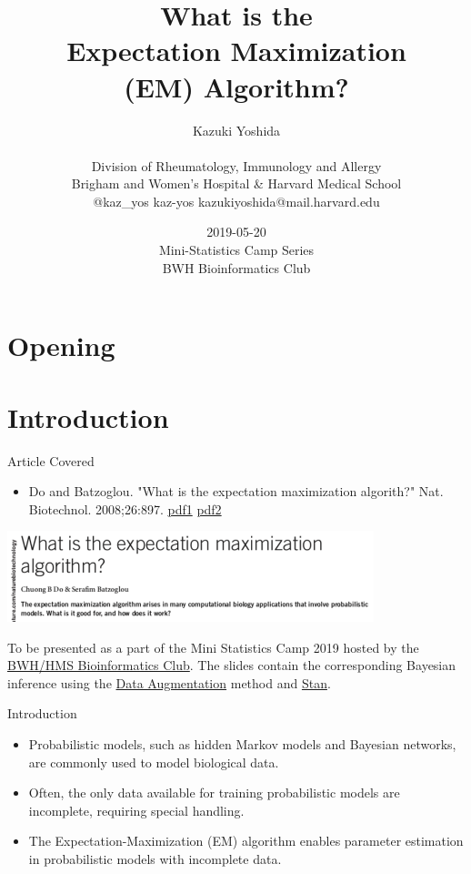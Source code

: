\documentclass[dvipdfmx,bigger,aspectratio=169]{beamer}
\author{Kazuki Yoshida \\ \\ Division of Rheumatology, Immunology and Allergy \\ Brigham and Women's Hospital \& Harvard Medical School \\ \faTwitter @kaz\_yos \faGithub kaz-yos \faEnvelope kazukiyoshida@mail.harvard.edu}
\date{2019-05-20\\ Mini-Statistics Camp Series \\ BWH Bioinformatics Club \\}
\title{What is the \\ Expectation Maximization \\ (EM) Algorithm? \\}
\begin{document}
\maketitle
\section{Opening}
\label{sec:orgb609150}


\section{Introduction}
\label{sec:org0b512a1}
\begin{frame}[label={sec:orgff30f97}]{Article Covered}
\begin{itemize}
\item Do and Batzoglou. "What is the expectation maximization algorith?" Nat. Biotechnol. 2008;26:897. \cite{doWhatExpectationMaximization2008} \href{https://www.cmi.ac.in/\~madhavan/courses/dmml2019jan/literature/EM\_algorithm\_2coin\_example.pdf}{pdf1} \href{http://www.utdallas.edu/\~prr105020/biol6385/2019/lecture/lecture\_4\_em\_paper.pdf}{pdf2}
\end{itemize}
\begin{center}
\includegraphics[page=1,keepaspectratio,width=0.8\textwidth]{./source/em_algo.png}
\end{center}
\footnotesize
To be presented as a part of the Mini Statistics Camp 2019 hosted by the \href{http://bioinformatics.bwh.harvard.edu}{BWH/HMS Bioinformatics Club}. The slides contain the corresponding Bayesian inference using the \hyperlink{sec:org536f30f}{Data Augmentation} method and \hyperlink{sec:org6e2589f}{Stan}.
\end{frame}

\begin{frame}[label={sec:orgf029e75}]{Introduction}
\begin{itemize}
\item Probabilistic models, such as hidden Markov models and Bayesian networks, are commonly used to model biological data.
\end{itemize}


\begin{itemize}
\item Often, the only data available for training probabilistic models are incomplete, requiring special handling.
\end{itemize}


\begin{itemize}
\item The Expectation-Maximization (EM) algorithm enables parameter estimation in probabilistic models with incomplete data.
\end{itemize}
\end{frame}
\end{document}
